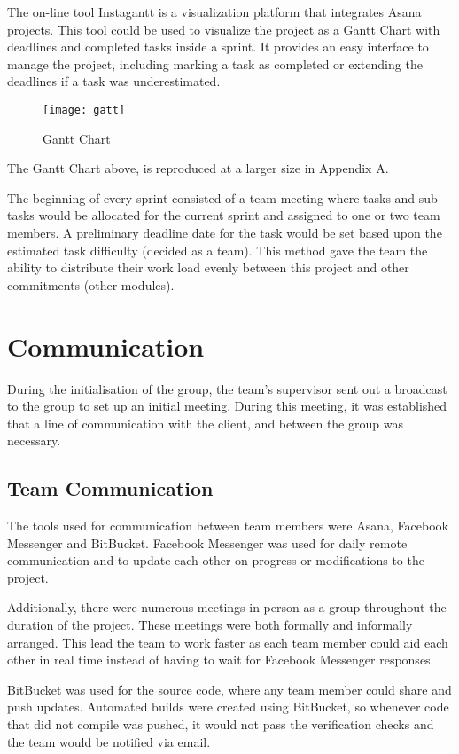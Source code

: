 The on-line tool Instagantt is a visualization platform that integrates Asana projects. This tool could be used to visualize the project as a Gantt Chart with deadlines and completed tasks inside a sprint. It provides an easy interface to manage the project, including marking a task as completed or extending the deadlines if a task was underestimated. 

\begin{figure}[H]
\centering
\texttt{[image: gatt]}
\caption{Gantt Chart}
\label{fig:gantt-chart}
\end{figure}

The Gantt Chart above, is reproduced at a larger size in Appendix A.

The beginning of every sprint consisted of a team meeting where tasks and sub-tasks would be allocated for the current sprint and assigned to one or two team members. A preliminary deadline date for the task would be set based upon the estimated task difficulty (decided as a team). This method gave the team the ability to distribute their work load evenly between this project and other commitments (other modules).
 
\section{Communication}

During the initialisation of the group, the team's supervisor sent out a broadcast to the group to set up an initial meeting. During this meeting, it was established that a line of communication with the client, and between the group was necessary.

\subsection{Team Communication}

The tools used for communication between team members were Asana, Facebook Messenger and BitBucket. Facebook Messenger was used for daily remote communication and to update each other on progress or modifications to the project.

Additionally, there were numerous meetings in person as a group throughout the duration of the project. These meetings were both formally and informally arranged. This lead the team to work faster as each team member could aid each other in real time instead of having to wait for Facebook Messenger responses. 

BitBucket was used for the source code, where any team member could share and push updates. Automated builds were created using BitBucket, so whenever code that did not compile was pushed, it would not pass the verification checks and the team would be notified via email.

